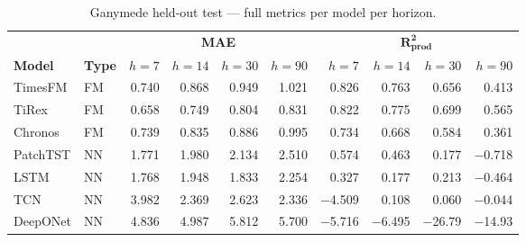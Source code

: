 \documentclass[11pt]{article}
\newcommand{\rp}{R^2_\text{prod}}
\begin{document}
\begin{table}[ht]
\centering
\caption{Ganymede held-out test — full metrics per model per horizon.}
\label{tab:ganymede_full}
\scriptsize
\setlength{\tabcolsep}{2pt}
\begin{tabular}{@{}ll rrrr rrrr @{}}
\toprule
 &  & \multicolumn{4}{c}{\textbf{MAE}} & \multicolumn{4}{c}{$\boldsymbol{\rp}$} \\
\cmidrule(lr){3-6} \cmidrule(lr){7-10}
\textbf{Model} & \textbf{Type} & $h{=}7$ & $h{=}14$ & $h{=}30$ & $h{=}90$ & $h{=}7$ & $h{=}14$ & $h{=}30$ & $h{=}90$ \\
\midrule
TimesFM  & FM   & 0.740 & 0.868 & 0.949 & 1.021 &  0.826 &  0.763 &  0.656 &  0.413 \\
TiRex    & FM   & 0.658 & 0.749 & 0.804 & 0.831 &  0.822 &  0.775 &  0.699 &  0.565 \\
Chronos  & FM   & 0.739 & 0.835 & 0.886 & 0.995 &  0.734 &  0.668 &  0.584 &  0.361 \\
PatchTST & NN   & 1.771 & 1.980 & 2.134 & 2.510 &  0.574 &  0.463 &  0.177 & $-$0.718 \\
LSTM     & NN   & 1.768 & 1.948 & 1.833 & 2.254 &  0.327 &  0.177 &  0.213 & $-$0.464 \\
TCN      & NN   & 3.982 & 2.369 & 2.623 & 2.336 & $-$4.509 &  0.108 &  0.060 & $-$0.044 \\
DeepONet & NN   & 4.836 & 4.987 & 5.812 & 5.700 & $-$5.716 & $-$6.495 & $-$26.79 & $-$14.93 \\
\bottomrule
\end{tabular}
\end{table}
\end{document}
